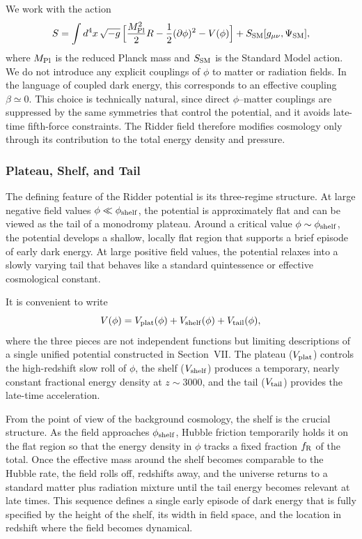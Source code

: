 \documentclass[a4paper,11pt]{article}
\begin{document}
We work with the action
\begin{equation}
S = \int d^4x\,\sqrt{-g}\,\Big[ \frac{M_{\rm Pl}^2}{2} R - \frac{1}{2} (\partial\phi)^2 - V(\phi) \Big] + S_{\rm SM}[g_{\mu\nu},\Psi_{\rm SM}] ,
\end{equation}
where $M_{\rm Pl}$ is the reduced Planck mass and $S_{\rm SM}$ is the Standard Model action. We do not introduce any explicit couplings of $\phi$ to matter or radiation fields. In the language of coupled dark energy, this corresponds to an effective coupling $\beta \simeq 0$. This choice is technically natural, since direct $\phi$--matter couplings are suppressed by the same symmetries that control the potential, and it avoids late-time fifth-force constraints. The Ridder field therefore modifies cosmology only through its contribution to the total energy density and pressure.

\subsubsection{Plateau, Shelf, and Tail}

The defining feature of the Ridder potential is its three-regime structure. At large negative field values $\phi \ll \phi_{\rm shelf}$, the potential is approximately flat and can be viewed as the tail of a monodromy plateau. Around a critical value $\phi \sim \phi_{\rm shelf}$, the potential develops a shallow, locally flat region that supports a brief episode of early dark energy. At large positive field values, the potential relaxes into a slowly varying tail that behaves like a standard quintessence or effective cosmological constant.

It is convenient to write
\begin{equation}
V(\phi) = V_{\rm plat}(\phi) + V_{\rm shelf}(\phi) + V_{\rm tail}(\phi) ,
\end{equation}
where the three pieces are not independent functions but limiting descriptions of a single unified potential constructed in Section~VII. The plateau ($V_{\rm plat}$) controls the high-redshift slow roll of $\phi$, the shelf ($V_{\rm shelf}$) produces a temporary, nearly constant fractional energy density at $z \sim 3000$, and the tail ($V_{\rm tail}$) provides the late-time acceleration.

From the point of view of the background cosmology, the shelf is the crucial structure. As the field approaches $\phi_{\rm shelf}$, Hubble friction temporarily holds it on the flat region so that the energy density in $\phi$ tracks a fixed fraction $f_{\rm R}$ of the total. Once the effective mass around the shelf becomes comparable to the Hubble rate, the field rolls off, redshifts away, and the universe returns to a standard matter plus radiation mixture until the tail energy becomes relevant at late times. This sequence defines a single early episode of dark energy that is fully specified by the height of the shelf, its width in field space, and the location in redshift where the field becomes dynamical.
\end{document}
